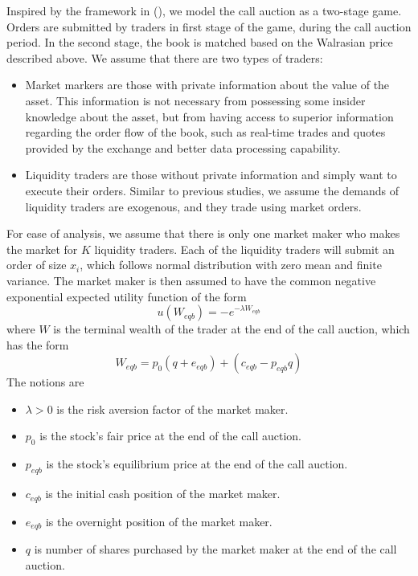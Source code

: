\documentclass{article}
\begin{document}
Inspired by the framework in (\cite{Madhavan2015}), we model the call auction as a two-stage game. Orders are submitted by traders in first stage of the game, during the call auction period.  In the second stage, the book is matched based on the Walrasian price described above. We assume that there are two types of traders:
\begin{itemize}
  \item Market markers are those with private information about the value of the asset. This information is not necessary from possessing some insider knowledge about the asset, but from having access to superior information regarding the order flow of the book, such as real-time trades and quotes provided by the exchange and better data processing capability.
  \item Liquidity traders are those without private information and simply want to execute their orders. Similar to previous studies, we assume the demands of liquidity traders are exogenous, and they trade using market orders.
\end{itemize}
For ease of analysis, we assume that there is only one market maker who makes the market for $K$ liquidity traders. Each of the liquidity traders will submit an order of size $x_i$, which follows normal distribution with zero mean and finite variance. The market maker is then assumed to  have the common negative exponential expected utility function of the form
\[
  u(W_{eqb}) = -e^{-\lambda W_{eqb}}
\]
where $W$ is the terminal wealth of the trader at the end of the call auction, which has the form
\[
  W_{eqb} = p_0 (q + e_{eqb}) + (c_{eqb} - p_{eqb} q)
\]
The notions are
\begin{itemize}
  \item $\lambda>0$ is the risk aversion factor of the market maker.
  \item $p_0$ is the stock's fair price at the end of the call auction.
  \item $p_{eqb}$ is the stock's equilibrium price at the end of the call auction.
  \item $c_{eqb}$ is the initial cash position of the market maker.
  \item $e_{eqb}$ is the overnight position of the market maker.
  \item $q$ is number of shares purchased by the market maker at the end of the call auction.
\end{itemize}
\end{document}
